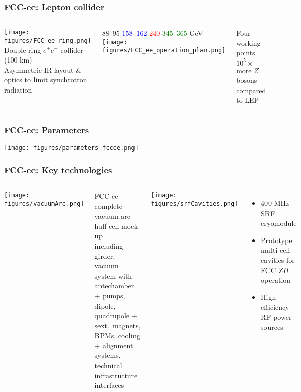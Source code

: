\documentclass[aspectratio=169]{beamer}
\begin{document}
\begin{frame}
  \frametitle{FCC-ee: Lepton collider}
  \begin{columns}[c]
     \texttt{[image: figures/FCC\_ee\_ring.png]}\\
     Double ring $e^+e^-$ collider (100 km)\\
     Asymmetric IR layout \& optics to limit synchrotron radiation\\

     \begin{center}
       {\footnotesize\hspace{3.3em}88--95
                  \hspace{0.2em}\textcolor{blue}{158--162}
                  \hspace{0.2em}\textcolor{red}{240
                  }\hspace{1.9em}\textcolor{green}{345--365} GeV}
      \texttt{[image: figures/FCC\_ee\_operation\_plan.png]}
     \end{center}
     Four working points\\
     $10^5 \times$ more $Z$ bosons compared to LEP\\
  \end{columns}
\end{frame}

\begin{frame}
    \frametitle{FCC-ee: Parameters}
    \texttt{[image: figures/parameters-fccee.png]}
\end{frame}


\begin{frame}
  \frametitle{FCC-ee: Key technologies}
  \begin{columns}[c]

    \begin{center}
      \texttt{[image: figures/vacuumArc.png]}\\
    \end{center}

    FCC-ee complete vacuum arc half-cell mock up\\[1ex]
    \small{%
    including girder, vacuum system with antechamber + pumps,
    dipole, quadrupole + sext.\ magnets, BPMs, cooling + alignment
    systems, technical infrastructure interfaces}


    \begin{center}
      \texttt{[image: figures/srfCavities.png]}\\
    \end{center}

    \begin{itemize}
      \item 400 MHz SRF cryomodule
      \item Prototype multi-cell cavities for FCC $ZH$ operation
      \item High-efficiency RF power sources
    \end{itemize}
  \end{columns}
\end{frame}
\end{document}
